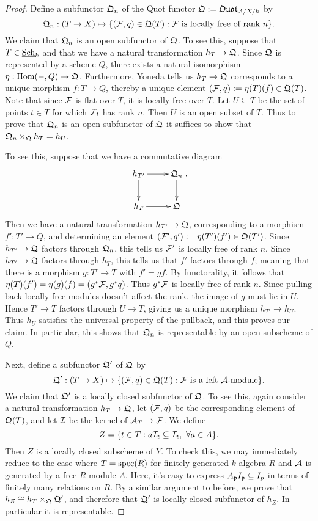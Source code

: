 \begin{proof}
Define a subfunctor $\mathfrak{Q}_n$ of the Quot functor $\mathfrak{Q} := \mathfrak{Quot}_{\mathcal{A}/X/k}$ by
$$\mathfrak{Q}_n: (T\rightarrow X)\mapsto \{(\mathcal{F},q)\in \mathfrak{Q}(T): \mathcal{F}\ \text{is locally free of rank $n$}\}.$$
We claim that $\mathfrak{Q}_n$ is an open subfunctor of $\mathfrak{Q}$.  To see this, suppose that $T\in\textnormal{\underline{Sch}}_k$ and that we have a natural transformation $h_T\rightarrow \mathfrak{Q}$.  Since $\mathfrak{Q}$ is represented by a scheme $Q$, there exists a natural isomorphism $\eta: \textnormal{Hom}(-,Q)\rightarrow\mathfrak{Q}$.  Furthermore, Yoneda tells us $h_T\rightarrow \mathfrak{Q}$ corresponds to a unique morphism $f:T\rightarrow Q$, thereby a unique element $(\mathcal{F},q) := \eta(T)(f)\in \mathfrak{Q}(T)$.  Note that since $\mathcal{F}$ is flat over $T$, it is locally free over $T$.  Let $U\subseteq T$ be the set of points $t\in T$ for which $\mathcal{F}_t$ has rank $n$.  Then $U$ is an open subset of $T$.  Thus to prove that $\mathfrak{Q}_n$ is an open subfunctor of $\mathfrak{Q}$ it suffices to show that $\mathfrak{Q}_n\times_{\mathfrak{Q}}h_T = h_U$.

To see this, suppose that we have a commutative diagram
$$\xymatrix{
h_{T'}\ar[d]\ar[r] & \FQ_n\ar[d]\\
h_{T}\ar[r]        & \FQ
}.$$
Then we have a natural transformation $h_{T'}\rightarrow\mathfrak{Q}$, corresponding to a morphism $f': T'\rightarrow Q$, and determining an element $(\mathcal{F}',q') := \eta(T')(f')\in \mathfrak{Q}(T')$.  Since $h_{T'}\rightarrow\mathfrak{Q}$ factors through $\mathfrak{Q}_n$, this tells us $\mathcal{F}'$ is locally free of rank $n$.  Since $h_{T'}\rightarrow\mathfrak{Q}$ factors through $h_T$, this tells us that $f'$ factors through $f$; meaning that there is a morphism $g:T'\rightarrow T$ with $f'=gf$.  By functorality, it follows that $\eta(T)(f') = \eta(g)(f) = (g^*\mathcal{F},g^*q)$.  Thus $g^*\mathcal{F}$ is locally free of rank $n$.  Since pulling back locally free modules doesn't affect the rank, the image of $g$ must lie in $U$.  Hence $T'\rightarrow T$ factors through $U\rightarrow T$, giving us a unique morphism $h_{T'}\rightarrow h_U$.  Thus $h_U$ satisfies the universal property of the pullback, and this proves our claim.  In particular, this shows that $\mathfrak{Q}_n$ is representable by an open subscheme of $Q$.

Next, define a subfunctor $\mathfrak{Q}'$ of $\mathfrak{Q}$ by
$$\mathfrak{Q}': (T\rightarrow X)\mapsto \{(\mathcal{F},q)\in \mathfrak{Q}(T): \mathcal{F}\ \text{is a left $\mathcal{A}$-module}\}.$$
We claim that $\mathfrak{Q}'$ is a locally closed subfunctor of $\mathfrak{Q}$.  To see this, again consider a natural transformation $h_T\rightarrow\mathfrak{Q}$, let $(\mathcal{F},q)$ be the corresponding element of $\mathfrak{Q}(T)$, and let $\mathcal{I}$ be the kernel of $\mathcal{A}_T\rightarrow \mathcal{F}$.  We define
$$Z = \{t\in T: a\mathcal{I}_t\subseteq \mathcal{I}_t,\ \forall a\in A\}.$$
Then $Z$ is a locally closed subscheme of $Y$.  To check this, we may immediately reduce to the case where $T=\textnormal{spec}(R)$ for finitely generated $k$-algebra $R$ and $\mathcal{A}$ is generated by a free $R$-module $A$.  Here, it's easy to express $A_{\mathfrak{p}} I_{\mathfrak{p}}\subseteq I_p$ in terms of finitely many relations on $R$.  By a similar argument to before, we prove that $h_Z\cong h_T\times_{\mathfrak{Q}} \mathfrak{Q}'$, and therefore that $\mathfrak{Q}'$ is locally closed subfunctor of $h_Z$.  In particular it is representable.


\end{proof}

